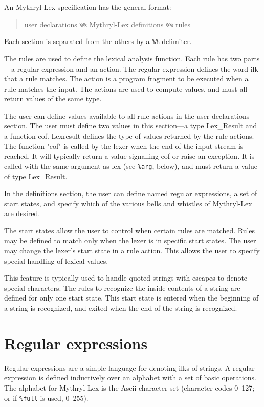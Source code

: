 An Mythryl-Lex specification has the general format:

\begin{quote}
        {user declarations}
        \verb|%%|
        {Mythryl-Lex definitions}
        \verb|%%|
        {rules}
\end{quote}

Each section is separated from the others by a \verb|%%| delimiter.

The rules are used to define the lexical analysis function.  Each
rule has two parts---a regular expression and an action.  The regular
expression defines the word ilk that a rule matches.  The action is
a program fragment to be executed when a rule matches the input.  The
actions are used to compute values, and must all return values of the
same type.

The user can define values available to all rule actions in the user
declarations section.  The user must define two values in this
section---a type Lex_Result and a function eof.  Lexresult defines the
type of values returned by the rule actions.  The function "eof" is
called by the lexer when the end of the input stream is reached.  It
will typically return a value signalling eof or raise an exception.
It is called with the same argument as lex (see \verb|%arg|, below),
and must return a value of type Lex_Result.

In the definitions section, the user can define named regular
expressions, a set of start states, and specify which of the various
bells and whistles of Mythryl-Lex are desired.

The start states allow the user to control when certain rules are
matched.  Rules may be defined to match only when the lexer is in
specific start states.  The user may change the lexer's start state
in a rule action.  This allows the user to specify special handling
of lexical values.

This feature is typically used to handle quoted strings with escapes
to denote special characters.  The rules to recognize the inside
contents of a string are defined for only one start state.  This
start state is entered when the beginning of a string is recognized,
and exited when the end of the string is recognized.

\section{Regular expressions}

Regular expressions are a simple language for denoting ilks of
strings.  A regular expression is defined inductively over an
alphabet with a set of basic operations.  The alphabet for Mythryl-Lex is
the Ascii character set (character codes 0--127; or if 
\verb|%full| is used, 0--255).

